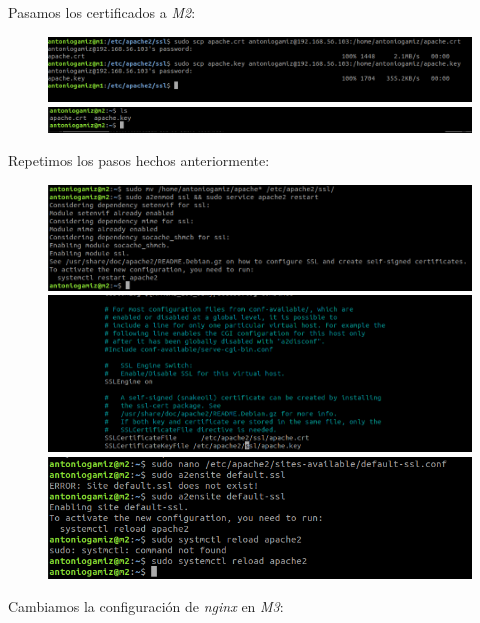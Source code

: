 \documentclass[12pt]{article}
\begin{document}
Pasamos los certificados a \textit{M2}:

\begin{figure}[H]
\center
\includegraphics[scale=0.5]{9.png}
\includegraphics[scale=0.5]{10.png}
\end{figure}

Repetimos los pasos hechos anteriormente:

\begin{figure}[H]
\center
\includegraphics[scale=0.5]{11.png}
\includegraphics[scale=0.5]{12.png}
\includegraphics[scale=0.5]{13.png}
\end{figure}

Cambiamos la configuración de \textit{nginx} en \textit{M3}:
\end{document}
